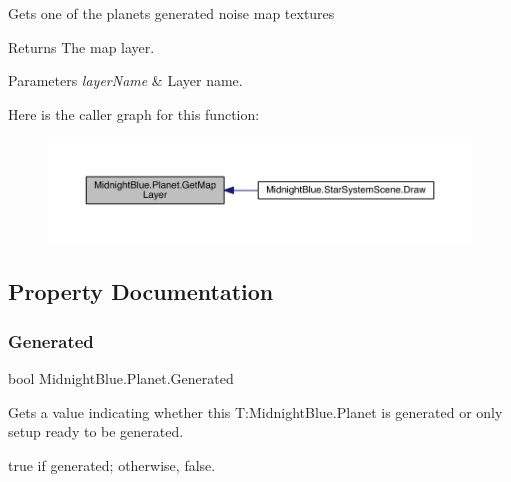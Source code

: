 Gets one of the planets generated noise map textures 

\begin{DoxyReturn}{Returns}
The map layer.
\end{DoxyReturn}

\begin{DoxyParams}{Parameters}
{\em layer\+Name} & Layer name.\\
\hline
\end{DoxyParams}
Here is the caller graph for this function\+:\nopagebreak
\begin{figure}[H]
\begin{center}
\leavevmode
\includegraphics[width=350pt]{class_midnight_blue_1_1_planet_ac3b3442ad8f168a8d9151386592eb270_icgraph}
\end{center}
\end{figure}


\subsection{Property Documentation}
\hypertarget{class_midnight_blue_1_1_planet_a525e5089a0a522069f10302d9ece26e1}{}\label{class_midnight_blue_1_1_planet_a525e5089a0a522069f10302d9ece26e1} 
\subsubsection{\texorpdfstring{Generated}{Generated}}
{\footnotesize\ttfamily bool Midnight\+Blue.\+Planet.\+Generated\hspace{0.3cm}{\ttfamily [get]}}



Gets a value indicating whether this T\+:\+Midnight\+Blue.\+Planet is generated or only setup ready to be generated. 

{\ttfamily true} if generated; otherwise, {\ttfamily false}.\hypertarget{class_midnight_blue_1_1_planet_a064b1e2b9aa83abac4065f4a7e0c5e58}{}\label{class_midnight_blue_1_1_planet_a064b1e2b9aa83abac4065f4a7e0c5e58} 
